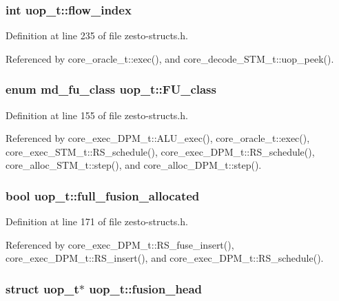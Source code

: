 \subsubsection[{flow\_\-index}]{\setlength{\rightskip}{0pt plus 5cm}int {\bf uop\_\-t::flow\_\-index}}\label{structuop__t_1606190a5e56586a16065646985b02e9}




Definition at line 235 of file zesto-structs.h.

Referenced by core\_\-oracle\_\-t::exec(), and core\_\-decode\_\-STM\_\-t::uop\_\-peek().
\subsubsection[{FU\_\-class}]{\setlength{\rightskip}{0pt plus 5cm}enum {\bf md\_\-fu\_\-class} {\bf uop\_\-t::FU\_\-class}}\label{structuop__t_156195a0d0889db67681f0900c044423}




Definition at line 155 of file zesto-structs.h.

Referenced by core\_\-exec\_\-DPM\_\-t::ALU\_\-exec(), core\_\-oracle\_\-t::exec(), core\_\-exec\_\-STM\_\-t::RS\_\-schedule(), core\_\-exec\_\-DPM\_\-t::RS\_\-schedule(), core\_\-alloc\_\-STM\_\-t::step(), and core\_\-alloc\_\-DPM\_\-t::step().
\subsubsection[{full\_\-fusion\_\-allocated}]{\setlength{\rightskip}{0pt plus 5cm}bool {\bf uop\_\-t::full\_\-fusion\_\-allocated}}\label{structuop__t_c7b59f0c9f5dd616855772ccd50554ad}




Definition at line 171 of file zesto-structs.h.

Referenced by core\_\-exec\_\-DPM\_\-t::RS\_\-fuse\_\-insert(), core\_\-exec\_\-DPM\_\-t::RS\_\-insert(), and core\_\-exec\_\-DPM\_\-t::RS\_\-schedule().
\subsubsection[{fusion\_\-head}]{\setlength{\rightskip}{0pt plus 5cm}struct {\bf uop\_\-t}$\ast$ {\bf uop\_\-t::fusion\_\-head}\hspace{0.3cm}{\tt  [read]}}\label{structuop__t_430e0f4aeb84fac91fc04ae7d31b5329}




